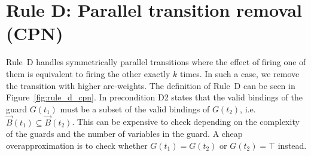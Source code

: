 \section*{Rule D: Parallel transition removal (CPN)}\label{sec:rule_d_cpn}
Rule~D handles symmetrically parallel transitions where the effect of firing one of them is equivalent to firing the other exactly $k$ times.
In such a case, we remove the transition with higher arc-weights.
The definition of Rule~D can be seen in Figure~\ref{fig:rule_d_cpn}.
In precondition D2 states that the valid bindings of the guard $G(t_1)$ must be a subset of the valid bindings of $G(t_2)$,
i.e.\ $\vec B(t_1)\subseteq\vec B(t_2)$.
This can be expensive to check depending on the complexity of the guards and the number of variables in the guard.
A cheap overapproximation is to check whether $G(t_1)=G(t_2)$ or $G(t_2)=\top$ instead.

